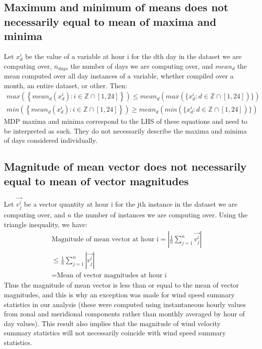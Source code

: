 \subsection[Max and min of mean vs mean of max and min]{Maximum and minimum of means does not necessarily equal to mean of maxima and minima}

Let $x^i_d$ be the value of a variable at hour i for the dth day in the dataset we are computing over, $n_{days}$ the number of days we are computing over, and $mean_d$ the mean computed over all day instances of a variable, whether compiled over a month, an entire dataset, or other. Then:
\begin{eqnarray}
	max\left( \left\{ mean_d(x^i_d) : i \in \mathbb{Z} \cap [1,24] \right\} \right) \leq mean_d \left( max( \{ x^i_d : d \in \mathbb{Z} \cap [1,24]) \} \right) \\
	min\left( \left\{ mean_d(x^i_d) : i \in \mathbb{Z} \cap [1,24] \right\} \right) \geq mean_d \left( min( \{ x^i_d : d \in \mathbb{Z} \cap [1,24]) \} \right)
\end{eqnarray}
\ac{MDP} maxima and minima correspond to the LHS of these equations and need to be interpreted as such. They do not necessarily describe the maxima and minima of days considered individually.

\subsection[Magnitude of mean vector vs mean of vector magnitudes]{Magnitude of mean vector does not necessarily equal to mean of vector magnitudes}

Let $\vec{v^i_j}$ be a vector quantity at hour i for the jth instance in the dataset we are computing over, and $n$ the number of instances we are computing over. Using the triangle inequality, we have:
\begin{eqnarray}
	\mbox{Magnitude of mean vector at hour i} = \left| \frac{1}{n} \sum_{j=1}^{n} \vec{v^i_j} \right| \\
	\leq \frac{1}{n} \sum_{j=1}^{n} |\vec{v^i_j}| \nonumber \\
	= \mbox{Mean of vector magnitudes at hour i} \nonumber
\end{eqnarray}
Thus the magnitude of mean vector is less than or equal to the mean of vector magnitudes, and this is why an exception was made for wind speed summary statistics in our analysis (these were computed using instantaneous hourly values from zonal and meridional components rather than monthly averaged by hour of day values). This result also implies that the magnitude of wind velocity summary statistics will not necessarily coincide with wind speed summary statistics.

